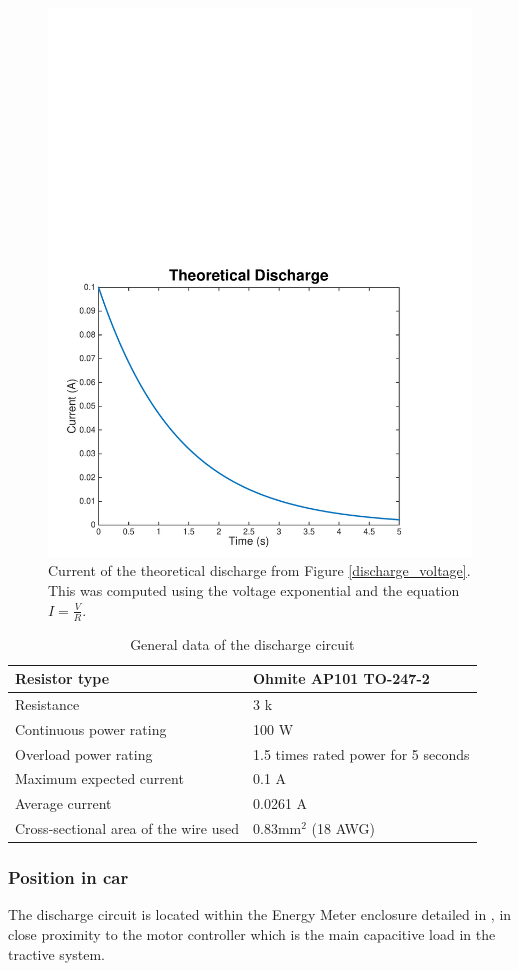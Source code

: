 \documentclass{article}
\begin{document}
\begin{figure}[H]
    \centering
    \includegraphics[width = 0.7 \textwidth]{discharge_current}
    \caption{Current of the theoretical discharge from Figure \ref{discharge_voltage}. This was computed using the voltage exponential and the equation $I = \frac{V}{R}$.}
    \label{discharge_current}
\end{figure}

	\begin{table}[H]
		\centering
		\begin{tabular}{|l|l|}
		\hline
		Resistor type & Ohmite AP101 TO-247-2 \\ \hline
		Resistance & 3 k\ohm \\ \hline
		Continuous power rating & 100 W \\ \hline
		Overload power rating & 1.5 times rated power for 5 seconds \\ \hline
		Maximum expected current & 0.1 A \\ \hline
		Average current & 0.0261 A\\ \hline
		Cross-sectional area of the wire used & 0.83mm$^2$ (18 AWG) \\ \hline
		\end{tabular}
		\caption{General data of the discharge circuit}
		\label{dctable}
	\end{table}

\subsubsection{Position in car}
The discharge circuit is located within the Energy Meter enclosure detailed in , in close proximity to the motor controller which is the main capacitive load in the tractive system. 
\end{document}
